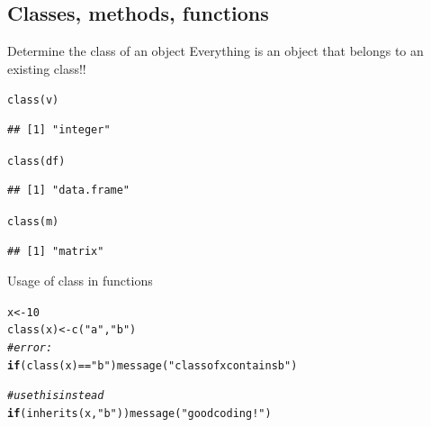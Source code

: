 \documentclass[xcolor=table,           xcolor=dvipsnames]{beamer}\usepackage[]{graphicx}\usepackage[]{color}
\makeatletter
\newcommand{\hlnum}[1]{\textcolor[rgb]{0,0,0}{#1}}
\newcommand{\hlstr}[1]{\textcolor[rgb]{0.545,0.137,0.137}{#1}}
\newcommand{\hlcom}[1]{\textcolor[rgb]{0,0.392,0}{\textit{#1}}}
\newcommand{\hlopt}[1]{\textcolor[rgb]{0,0,0}{#1}}
\newcommand{\hlstd}[1]{\textcolor[rgb]{0,0,0}{#1}}
\newcommand{\hlkwa}[1]{\textcolor[rgb]{1,0,0}{\textbf{#1}}}
\newcommand{\hlkwb}[1]{\textcolor[rgb]{0,0,0}{#1}}
\newcommand{\hlkwd}[1]{\textcolor[rgb]{0,0,1}{#1}}
\newenvironment{kframe}{%
 \def\at@end@of@kframe{}%
 \ifinner\ifhmode%
  \def\at@end@of@kframe{\end{minipage}}%
  \begin{minipage}{\columnwidth}%
 \fi\fi%
 \def\FrameCommand##1{\hskip\@totalleftmargin \hskip-\fboxsep
 \colorbox{shadecolor}{##1}\hskip-\fboxsep
     \hskip-\linewidth \hskip-\@totalleftmargin \hskip\columnwidth}%
 \MakeFramed {\advance\hsize-\width
   \@totalleftmargin\z@ \linewidth\hsize
   \@setminipage}}%
 {\par\unskip\endMakeFramed%
 \at@end@of@kframe}
\newenvironment{knitrout}{}{} %
\makeatother
\begin{document}
\subsection{Classes, methods, functions}

\begin{frame}[fragile]{Determine the class of an object}
	Everything is an object that belongs to an existing class!!
\begin{knitrout}
\color{fgcolor}\begin{kframe}
\begin{alltt}
\hlkwd{class}\hlstd{(v)}
\end{alltt}
\begin{verbatim}
## [1] "integer"
\end{verbatim}
\begin{alltt}
\hlkwd{class}\hlstd{(df)}
\end{alltt}
\begin{verbatim}
## [1] "data.frame"
\end{verbatim}
\begin{alltt}
\hlkwd{class}\hlstd{(m)}
\end{alltt}
\begin{verbatim}
## [1] "matrix"
\end{verbatim}
\end{kframe}
\end{knitrout}
\end{frame}


\begin{frame}[fragile]{Usage of class in functions}
\begin{knitrout}
\color{fgcolor}\begin{kframe}
\begin{alltt}
\hlstd{x} \hlkwb{<-} \hlnum{10}
\hlkwd{class}\hlstd{(x)} \hlkwb{<-} \hlkwd{c}\hlstd{(}\hlstr{"a"}\hlstd{,} \hlstr{"b"}\hlstd{)}
\hlcom{# error:}
\hlkwa{if}\hlstd{(} \hlkwd{class}\hlstd{(x)} \hlopt{==} \hlstr{"b"}   \hlstd{)} \hlkwd{message}\hlstd{(}\hlstr{"class of x contains b"}\hlstd{)}
\end{alltt}


{\ttfamily\noindent{}}\begin{alltt}
\hlcom{# use this instead}
\hlkwa{if}\hlstd{(} \hlkwd{inherits}\hlstd{(x,} \hlstr{"b"}\hlstd{)  )} \hlkwd{message}\hlstd{(}\hlstr{"good coding!"}\hlstd{)}
\end{alltt}


{\ttfamily\noindent\itshape\color{messagecolor}{\#\# good coding!}}\end{kframe}
\end{knitrout}
\end{frame}
\end{document}
